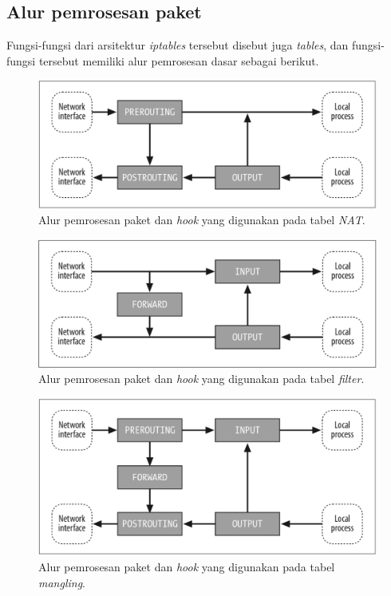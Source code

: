 \subsection{Alur pemrosesan paket}
Fungsi-fungsi dari arsitektur \textit{iptables} tersebut disebut juga \textit{tables}, dan fungsi-fungsi tersebut memiliki alur pemrosesan dasar sebagai berikut.\\
\begin{figure}[H]
	\centering
	\includegraphics[width=\textwidth]{resources/nat_table.png}
	\caption{Alur pemrosesan paket dan \textit{hook} yang digunakan pada tabel \textit{NAT}.}
	\label{fig:packetflow_NAT}
\end{figure}

\begin{figure}[H]
	\centering
	\includegraphics[width=\textwidth]{resources/filter_table.png}
	\caption{Alur pemrosesan paket dan \textit{hook} yang digunakan pada tabel \textit{filter}.}
	\label{fig:packetflow_filter}
\end{figure}

\begin{figure}[H]
	\centering
	\includegraphics[width=\textwidth]{resources/mangling_table.png}
	\caption{Alur pemrosesan paket dan \textit{hook} yang digunakan pada tabel \textit{mangling}.}
	\label{fig:packetflow_mangling}
\end{figure}

